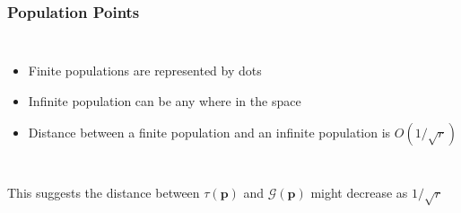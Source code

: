 \documentclass[aspectratio=169]{beamer}
\begin{document}
  \begin{frame}
    \frametitle{Population Points }
    \begin{columns}
	\centering
	\begin{itemize}
	  \item{Finite populations are represented by dots}
	  \item{Infinite population can be any where in the space}
	  \item{Distance between a finite population and an infinite population is  $O(1/\sqrt{r})$}
	\end{itemize}
    \end{columns}
    This suggests the distance between $\tau(\bm{p})$ and $\mathcal{G}(\bm{p})$ might decrease as $1/\sqrt{r}$
  \end{frame}
  
\end{document}
